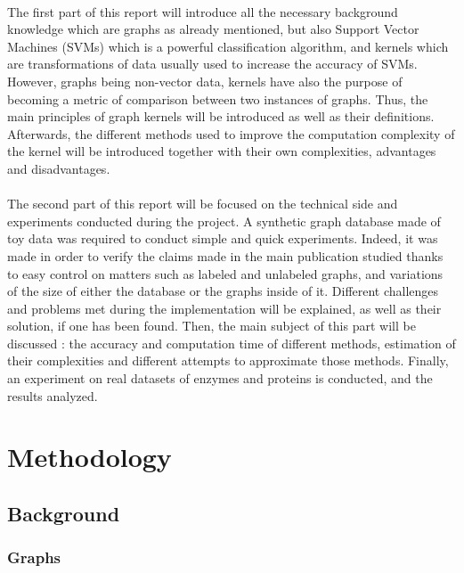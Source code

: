 \documentclass{article}
\theoremstyle{definition}
\begin{document}
 \paragraph{}The first part of this report will introduce all the necessary background knowledge which are graphs as already mentioned, but also Support Vector Machines (SVMs) which is a powerful classification algorithm, and kernels which are transformations of data usually used to increase the accuracy of SVMs. However, graphs being non-vector data, kernels have also the purpose of becoming a metric of comparison between two instances of graphs. Thus, the main principles of graph kernels will be introduced as well as their definitions. Afterwards, the different methods used to improve the computation complexity of the kernel will be introduced together with their own complexities, advantages and disadvantages.

\paragraph{}The second part of this report will be focused on the technical side and experiments conducted during the project. A synthetic graph database made of toy data was required to conduct simple and quick experiments. Indeed, it was made in order to verify the claims made in the main publication studied thanks to easy control on matters such as labeled and unlabeled graphs, and variations of the size of either the database or the graphs inside of it. Different challenges and problems met during the implementation will be explained, as well as their solution, if one has been found. Then, the main subject of this part will be discussed : the accuracy and computation time of different methods, estimation of their complexities and different attempts to approximate those methods. Finally, an experiment on real datasets of enzymes and proteins is conducted, and the results analyzed.

\newpage
\section{Methodology}
\subsection{Background}
\subsubsection{Graphs}
\end{document}
